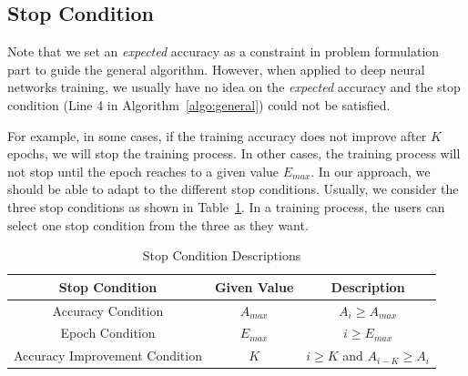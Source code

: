 \documentclass{llncs}
\begin{document}
\subsection{Stop Condition}

Note that we set an \textit{expected} accuracy as a constraint in problem formulation part to guide the general algorithm. However, when applied to deep neural networks training, we usually have no idea on the \textit{expected} accuracy and the stop condition (Line 4 in Algorithm~\ref{algo:general}) could not be satisfied. 

For example, in some cases, if the training accuracy does not improve after $K$ epochs, we will stop the training process. In other cases, the training process will not stop until the epoch reaches to a given value $E_{max}$. 
In our approach, we should be able to adapt to the different stop conditions. Usually, we consider the three stop conditions as shown in Table~\ref{tab:stop-condition}. In a training process, the users can select one stop condition from the three as they want.


\begin{table}[]
    \centering
    \begin{tabular}{|c|c|c|}
         \hline Stop Condition & Given Value& Description \\
         \hline Accuracy Condition & $A_{max}$ & $A_i \geq A_{max}$ \\
         \hline Epoch Condition &  $E_{max}$ & $i \geq E_{max}$  \\
         \hline Accuracy Improvement Condition  &  $K$ & $i \geq K$ and $ A_{i-K} \geq A_i$ \\
         \hline
    \end{tabular}
    \centering
    \newline
    \newline
    \caption{Stop Condition Descriptions}
    \label{tab:stop-condition}
\end{table}




\end{document}
